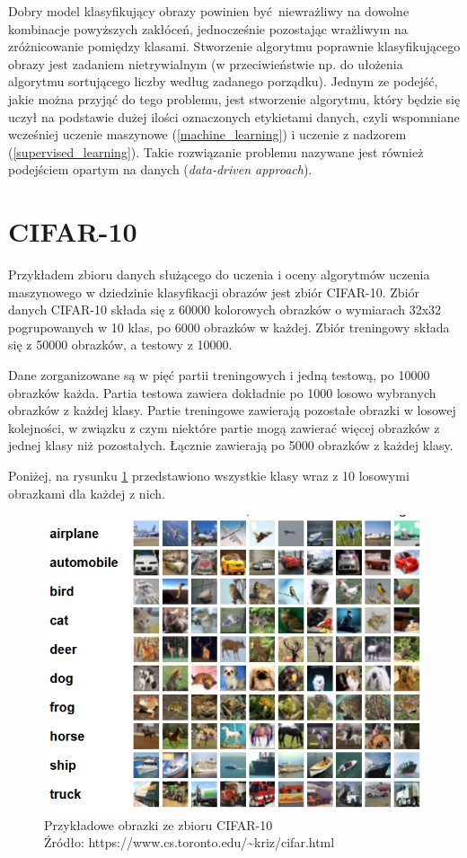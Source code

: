 Dobry model klasyfikujący obrazy powinien być niewrażliwy na dowolne kombinacje powyższych zakłóceń, jednocześnie pozostając wrażliwym na zróżnicowanie pomiędzy klasami.
Stworzenie algorytmu poprawnie klasyfikującego obrazy jest zadaniem nietrywialnym (w przeciwieństwie np. do ułożenia algorytmu sortującego liczby według zadanego porządku).
Jednym ze podejść, jakie można przyjąć do tego problemu, jest stworzenie algorytmu, który będzie się uczył na podstawie dużej ilości oznaczonych etykietami danych, czyli wspomniane wcześniej uczenie maszynowe (\ref{machine_learning}) i uczenie z nadzorem (\ref{supervised_learning}).
Takie rozwiązanie problemu nazywane jest również podejściem opartym na danych (\textit{data-driven approach}).
\cite{cs231n}


\section{CIFAR-10}
Przykładem zbioru danych służącego do uczenia i oceny algorytmów uczenia maszynowego w dziedzinie klasyfikacji obrazów jest zbiór CIFAR-10.
Zbiór danych CIFAR-10 składa się z 60000 kolorowych obrazków o wymiarach 32x32 pogrupowanych w 10 klas, po 6000 obrazków w każdej. Zbiór treningowy składa się z 50000 obrazków, a testowy z 10000.

Dane zorganizowane są w pięć partii treningowych i jedną testową, po 10000 obrazków każda. Partia testowa zawiera dokładnie po 1000 losowo wybranych obrazków z każdej klasy. Partie treningowe zawierają pozostałe obrazki w losowej kolejności, w związku z czym niektóre partie mogą zawierać więcej obrazków z jednej klasy niż pozostałych. Łącznie zawierają po 5000 obrazków z każdej klasy.

Poniżej, na rysunku \ref{fig:sample_data} przedstawiono wszystkie klasy wraz z 10 losowymi obrazkami dla każdej z nich.
\begin{figure}[h!tb]
	 \centering
	 \includegraphics[width = 1.0\linewidth]{img/sample_images}
	 \caption{Przykładowe obrazki ze zbioru CIFAR-10 \\
              Źródło: https://www.cs.toronto.edu/\textasciitilde kriz/cifar.html}
	 \label{fig:sample_data}
\end{figure}

